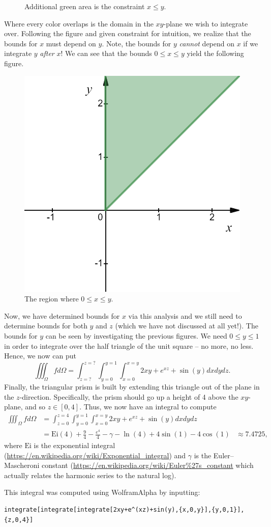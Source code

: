 \documentclass[12pt]{article} %
\begin{document}
\begin{solution}
\begin{figure}[H]
    \caption{Additional green area is the constraint $x\leq y$.}
\end{figure}
Where every color overlaps is the domain in the $xy$-plane we wish to integrate over. Following the figure and given constraint for intuition, we realize that the bounds for $x$ must depend on $y$. Note, the bounds for $y$ \emph{cannot} depend on $x$ if we integrate $y$ \emph{after} $x$! We can see that the bounds $0\leq x \leq y$ yield the following figure.
\begin{figure}[H]
    \centering
    \includegraphics[width=.6\textwidth]{Figures/bounds_3.png}
    \caption{The region where $0\leq x\leq y$.}
\end{figure}
Now, we have determined bounds for $x$ via this analysis and we still need to determine bounds for both $y$ and $z$ (which we have not discussed at all yet!). The bounds for $y$ can be seen by investigating the previous figures. We need $0\leq y \leq 1$ in order to integrate over the half triangle of the unit square -- no more, no less. Hence, we now can put
\[
\iiint_{\Omega} f d\Omega = \int_{z=?}^{z=?} \int_{y=0}^{y=1} \int_{x=0}^{x=y} 2xy +e^{xz} + \sin(y) dxdydz.
\]
Finally, the triangular prism is built by extending this triangle out of the plane in the $z$-direction. Specifically, the prism should go up a height of 4 above the $xy$-plane, and so $z \in [0,4]$. Thus, we now have an integral to compute
\begin{align*}
\iiint_{\Omega} f d\Omega &= \int_{z=0}^{z=4} \int_{y=0}^{y=1} \int_{x=0}^{x=y} 2xy +e^{xz} + \sin(y) dxdydz\\
&= \mathrm{Ei}(4) + \frac{9}{4} - \frac{e^4}{4} - \gamma - \ln(4) + 4\sin(1) -4\cos(1)
&\approx 7.4725,
\end{align*}
where $\mathrm{Ei}$ is the exponential integral (\url{https://en.wikipedia.org/wiki/Exponential_integral}) and $\gamma$ is the Euler--Mascheroni constant (\url{https://en.wikipedia.org/wiki/Euler%27s_constant} which actually relates the harmonic series to the natural log).

This integral was computed using WolframAlpha by inputting:
\begin{verbatim}
integrate[integrate[integrate[2xy+e^(xz)+sin(y),{x,0,y}],{y,0,1}],{z,0,4}]
\end{verbatim}
\end{solution}
\end{document}
